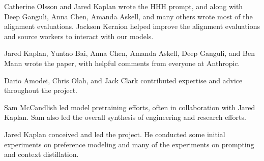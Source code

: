 Catherine Olsson and Jared Kaplan wrote the HHH prompt, and along with Deep Ganguli, Anna Chen, Amanda Askell, and many others wrote most of the alignment evaluations.  Jackson Kernion helped improve the alignment evaluations and source workers to interact with our models.

Jared Kaplan, Yuntao Bai, Anna Chen, Amanda Askell, Deep Ganguli, and Ben Mann wrote the paper, with helpful comments from everyone at Anthropic.

Dario Amodei, Chris Olah, and Jack Clark contributed expertise and advice throughout the project.

Sam McCandlish led model pretraining efforts, often in collaboration with Jared Kaplan.  Sam also led the overall synthesis of engineering and research efforts.

Jared Kaplan conceived and led the project.  He conducted some initial experiments on preference modeling and many of the experiments on prompting and context distillation.


